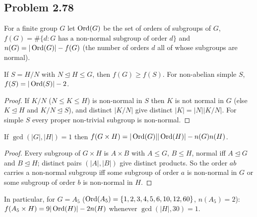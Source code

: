 \subsection{Problem 2.78}\label{app:278}

For a finite group $G$ let $\operatorname{Ord}(G)$ be the set of orders of subgroups of $G$, $f(G)=\#\{d:G\text{ has a non-normal
subgroup of order }d\}$ and $n(G)=|\operatorname{Ord}(G)|-f(G)$ (the number of orders $d$ all of whose subgroups are normal).

\begin{lemma}[sections]\label{lem:278A}
If $S=H/N$ with $N\trianglelefteq H\le G$, then $f(G)\ge f(S)$. For non-abelian simple $S$, $f(S)=|\operatorname{Ord}(S)|-2$.
\end{lemma}
\begin{proof}
If $K/N$ ($N\le K\le H$) is non-normal in $S$ then $K$ is not normal in $G$ (else $K\trianglelefteq H$ and
$K/N\trianglelefteq S$), and distinct $|K/N|$ give distinct $|K|=|N||K/N|$. For simple $S$ every proper non-trivial
subgroup is non-normal.
\end{proof}

\begin{lemma}\label{lem:278B}
If $\gcd(|G|,|H|)=1$ then $f(G\times H)=|\operatorname{Ord}(G)||\operatorname{Ord}(H)|-n(G)n(H)$.
\end{lemma}
\begin{proof}
Every subgroup of $G\times H$ is $A\times B$ with $A\le G$, $B\le H$, normal iff $A\trianglelefteq G$ and
$B\trianglelefteq H$; distinct pairs $(|A|,|B|)$ give distinct products. So the order $ab$ carries a non-normal
subgroup iff some subgroup of order $a$ is non-normal in $G$ or some subgroup of order $b$ is non-normal in $H$.
\end{proof}
In particular, for $G=A_5$ ($\operatorname{Ord}(A_5)=\{1,2,3,4,5,6,10,12,60\}$, $n(A_5)=2$): $f(A_5\times H)=9|\operatorname{Ord}(H)|-2n(H)$
whenever $\gcd(|H|,30)=1$.

